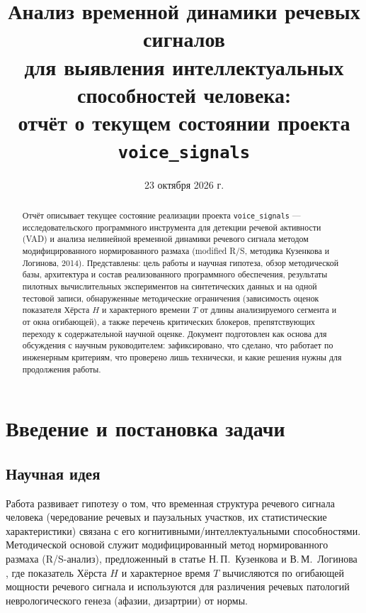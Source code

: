 \documentclass[12pt,a4paper]{article}
\title{\textbf{Анализ временной динамики речевых сигналов \\
для выявления интеллектуальных способностей человека: \\
отчёт о текущем состоянии проекта \texttt{voice\_signals}}}
\author{}
\date{23 октября 2026 г.}
\begin{document}
\maketitle

\begin{abstract}
\noindent
Отчёт описывает текущее состояние реализации проекта \texttt{voice\_signals} —
исследовательского программного инструмента для детекции речевой активности
(VAD) и анализа нелинейной временной динамики речевого сигнала методом
модифицированного нормированного размаха (modified R/S, методика
Кузенкова и Логинова, 2014). Представлены: цель работы и научная гипотеза,
обзор методической базы, архитектура и состав реализованного программного
обеспечения, результаты пилотных вычислительных экспериментов на синтетических
данных и на одной тестовой записи, обнаруженные методические ограничения
(зависимость оценок показателя Хёрста $H$ и характерного времени $T$ от длины
анализируемого сегмента и от окна огибающей), а также перечень критических
блокеров, препятствующих переходу к содержательной научной оценке.
Документ подготовлен как основа для обсуждения с научным руководителем:
зафиксировано, что сделано, что работает по инженерным критериям, что
проверено лишь технически, и какие решения нужны для продолжения работы.
\end{abstract}

\tableofcontents

\section{Введение и постановка задачи}

\subsection{Научная идея}

Работа развивает гипотезу о том, что временная структура речевого сигнала
человека (чередование речевых и паузальных участков, их статистические
характеристики) связана с его когнитивными/интеллектуальными способностями.
Методической основой служит модифицированный метод нормированного размаха
(R/S-анализ), предложенный в статье Н.\,П.~Кузенкова и В.\,М.~Логинова
\cite{kuzenkov2014}, где показатель Хёрста $H$ и характерное время $T$
вычисляются по огибающей мощности речевого сигнала и используются для
различения речевых патологий неврологического генеза (афазии, дизартрии)
от нормы.
\end{document}
